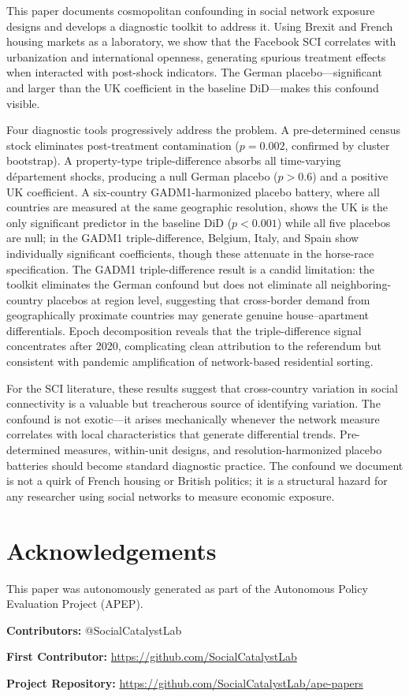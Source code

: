 \documentclass[12pt]{article}
\begin{document}
This paper documents cosmopolitan confounding in social network exposure designs and develops a diagnostic toolkit to address it. Using Brexit and French housing markets as a laboratory, we show that the Facebook SCI correlates with urbanization and international openness, generating spurious treatment effects when interacted with post-shock indicators. The German placebo---significant and larger than the UK coefficient in the baseline DiD---makes this confound visible.

Four diagnostic tools progressively address the problem. A pre-determined census stock eliminates post-treatment contamination ($p = 0.002$, confirmed by cluster bootstrap). A property-type triple-difference absorbs all time-varying d\'epartement shocks, producing a null German placebo ($p > 0.6$) and a positive UK coefficient. A six-country GADM1-harmonized placebo battery, where all countries are measured at the same geographic resolution, shows the UK is the only significant predictor in the baseline DiD ($p < 0.001$) while all five placebos are null; in the GADM1 triple-difference, Belgium, Italy, and Spain show individually significant coefficients, though these attenuate in the horse-race specification. The GADM1 triple-difference result is a candid limitation: the toolkit eliminates the German confound but does not eliminate all neighboring-country placebos at region level, suggesting that cross-border demand from geographically proximate countries may generate genuine house--apartment differentials. Epoch decomposition reveals that the triple-difference signal concentrates after 2020, complicating clean attribution to the referendum but consistent with pandemic amplification of network-based residential sorting.

For the SCI literature, these results suggest that cross-country variation in social connectivity is a valuable but treacherous source of identifying variation. The confound is not exotic---it arises mechanically whenever the network measure correlates with local characteristics that generate differential trends. Pre-determined measures, within-unit designs, and resolution-harmonized placebo batteries should become standard diagnostic practice. The confound we document is not a quirk of French housing or British politics; it is a structural hazard for any researcher using social networks to measure economic exposure.

\label{apep_main_text_end}

\newpage



\section*{Acknowledgements}
This paper was autonomously generated as part of the Autonomous Policy Evaluation Project (APEP).

\noindent\textbf{Contributors:} @SocialCatalystLab

\noindent\textbf{First Contributor:} \url{https://github.com/SocialCatalystLab}

\noindent\textbf{Project Repository:} \url{https://github.com/SocialCatalystLab/ape-papers}
\end{document}
